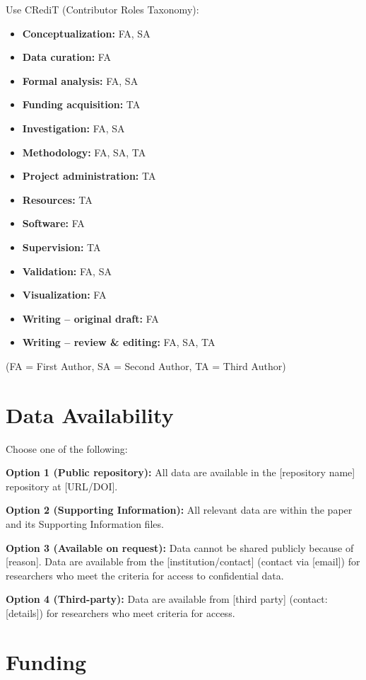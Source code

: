 \documentclass[10pt,letterpaper]{article}
\begin{document}
Use CRediT (Contributor Roles Taxonomy):
\begin{itemize}
    \item \textbf{Conceptualization:} FA, SA
    \item \textbf{Data curation:} FA
    \item \textbf{Formal analysis:} FA, SA
    \item \textbf{Funding acquisition:} TA
    \item \textbf{Investigation:} FA, SA
    \item \textbf{Methodology:} FA, SA, TA
    \item \textbf{Project administration:} TA
    \item \textbf{Resources:} TA
    \item \textbf{Software:} FA
    \item \textbf{Supervision:} TA
    \item \textbf{Validation:} FA, SA
    \item \textbf{Visualization:} FA
    \item \textbf{Writing – original draft:} FA
    \item \textbf{Writing – review \& editing:} FA, SA, TA
\end{itemize}

(FA = First Author, SA = Second Author, TA = Third Author)

\section*{Data Availability}

Choose one of the following:

\textbf{Option 1 (Public repository):}
All data are available in the [repository name] repository at [URL/DOI].

\textbf{Option 2 (Supporting Information):}
All relevant data are within the paper and its Supporting Information files.

\textbf{Option 3 (Available on request):}
Data cannot be shared publicly because of [reason]. Data are available from the [institution/contact] (contact via [email]) for researchers who meet the criteria for access to confidential data.

\textbf{Option 4 (Third-party):}
Data are available from [third party] (contact: [details]) for researchers who meet criteria for access.

\section*{Funding}
\end{document}
